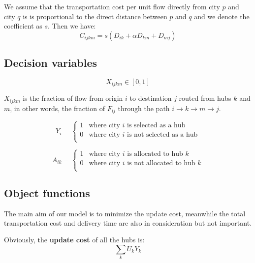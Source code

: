 \documentclass{llncs}
\begin{document}
	We assume that the transportation cost per unit flow directly from city $p$ and city $q$ is is proportional to the direct distance between $p$ and $q$ and we denote the coefficient as $s$. Then we have:
	\begin{equation}
	C_{ijkm} = s(D_{ik}+\alpha D_{km}+D_{mj})
	\label{eq:c}
	\end{equation}
	
	\subsection{Decision variables}
	
	\begin{equation}
	X_{ijkm} \in [0,1]
	\end{equation}
	
	$X_{ijkm}$ is the fraction of flow from origin $i$ to destination $j$ routed from hubs $k$ and $m$, in other words, the fraction of $F_{ij}$ through the path $i \rightarrow k \rightarrow m\rightarrow j$.
	
	\begin{equation}\label{}
	Y_{i} = 
	\left\{  
	\begin{array}{ll}  
	1 & \text{where city $i$ is selected as a hub} \\  
	0 &  \text{where city $i$ is not selected as a hub}\\      
	\end{array}  
	\right.  
	\end{equation}
	
	\begin{equation}\label{}
	A_{ik} = 
	\left\{  
	\begin{array}{ll}  
	1 & \text{where city $i$ is allocated to hub $k$} \\  
	0 &  \text{where city $i$ is not allocated to hub $k$}\\      
	\end{array}  
	\right.  
	\end{equation}
	
\subsection{Object functions}
	The main aim of our model is to minimize the update cost, meanwhile the total transportation cost and delivery time are also in consideration but not important.
	
	Obviously, the \textbf{update cost} of all the hubs is:
	\begin{equation}
	    \sum_{k}U_k Y_{k}
	\end{equation}
	
\end{document}
